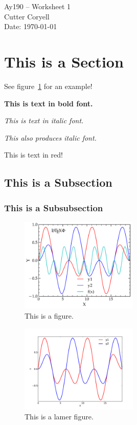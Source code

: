\documentclass[11pt,letterpaper]{article}
\begin{document}
\begin{center}
\Large
Ay190 -- Worksheet 1\\
Cutter Coryell\\
Date: \today
\end{center}

\section{This is a Section}

See figure~\ref{fig:simpleplot2} for an example!

{\bf This is text in bold font.}

\emph{This is text in italic font.}

{\it This also produces italic font.}

{\color{red} This is text in red!}

\subsection{This is a Subsection}

\subsubsection{This is a Subsubsection}

\begin{figure}[bth]
\centering
\includegraphics[width=0.5\textwidth]{simpleplot2.pdf}
\caption{This is a figure.}
\label{fig:simpleplot2}
\end{figure}

\begin{figure}[bth]
\centering
\includegraphics[width=0.5\textwidth]{simpleplot.pdf}
\caption{This is a lamer figure.}
\label{fig:simpleplot}
\end{figure}
\end{document}
